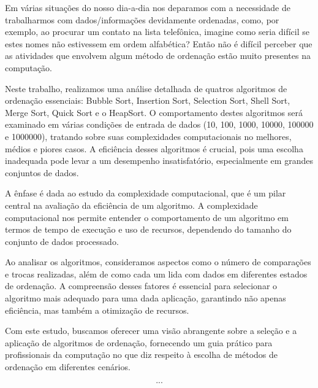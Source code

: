 \qquad Em várias situações do nosso dia-a-dia nos deparamos com a necessidade de trabalharmos com dados/informações devidamente ordenadas, como, por exemplo, ao procurar um contato na lista telefônica, imagine como seria difícil se estes nomes não estivessem em ordem alfabética? Então não é difícil perceber que as atividades que envolvem algum método de ordenação estão muito presentes na
computação.
\par Neste trabalho, realizamos uma análise detalhada de quatros algoritmos de ordenação essenciais: Bubble Sort, Insertion Sort, Selection Sort, Shell Sort, Merge Sort, Quick Sort e o HeapSort. O comportamento destes algoritmos será examinado em várias condições de entrada de dados (10, 100, 1000, 10000, 100000 e 1000000), tratando sobre suas complexidades computacionais no melhores, médios e piores casos. A eficiência desses algoritmos é crucial, pois uma escolha inadequada pode levar a um desempenho insatisfatório, especialmente em grandes conjuntos de dados\cite{cormen2002}.
\par A ênfase é dada ao estudo da complexidade computacional, que é um pilar central na avaliação da eficiência de um algoritmo. A complexidade computacional nos permite entender o comportamento de um algoritmo em termos de tempo de execução e uso de recursos, dependendo do tamanho do conjunto de dados processado\cite{silva2023analise}.
\par Ao analisar os algoritmos, consideramos aspectos como o número de comparações e trocas realizadas, além de como cada um lida com dados em diferentes estados de ordenação. A compreensão desses fatores é essencial para selecionar o algoritmo mais adequado para uma dada aplicação, garantindo não apenas eficiência, mas também a otimização de recursos.
\par Com este estudo, buscamos oferecer uma visão abrangente sobre a seleção e a aplicação de algoritmos de ordenação, fornecendo um guia prático para profissionais da computação no que diz respeito à escolha de métodos de ordenação em diferentes cenários.


\[...\]